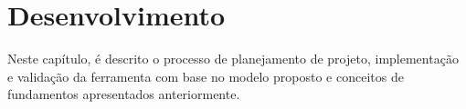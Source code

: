 \chapter{Desenvolvimento}

Neste capítulo, é descrito o processo de planejamento de projeto, implementação e validação da ferramenta com base no modelo proposto e conceitos de fundamentos apresentados anteriormente.




